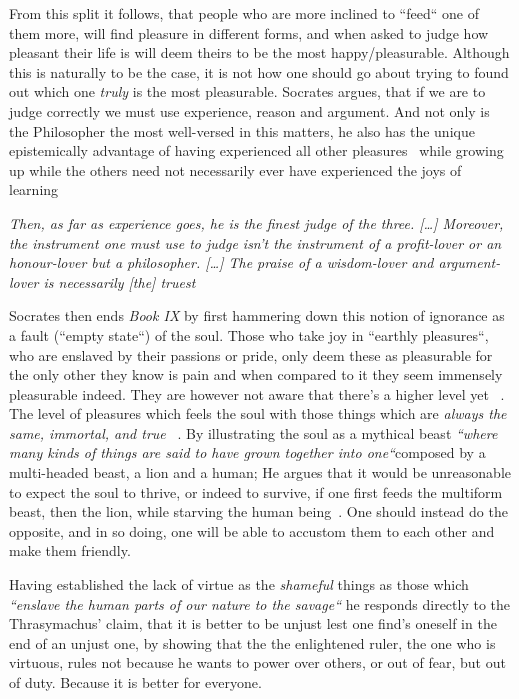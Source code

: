 \documentclass[english,course]{Notes}
\newcommand{\ita}[1]{\textit{#1}}
\newcommand\quo[1]{\begin{displayquote}\ita{\large{#1}}\end{displayquote}}
\begin{document}
\par{From this split it follows, that people who are more inclined to ``feed`` one of them more, will find pleasure in different forms, and when asked to judge how pleasant their life is will deem theirs to be the most happy/pleasurable. Although this is naturally to be the case, it is not how one should go about trying to found out which one \ita{truly} is the most pleasurable. Socrates argues, that if we are to judge correctly we must use experience, reason and argument. And not only is the Philosopher the most well-versed in this matters, he also has the unique epistemically advantage of having experienced all other pleasures~ while growing up while the others need not necessarily ever have experienced the joys of learning}

\quo{Then, as far as experience goes, he is the finest judge of the three. [\dots] Moreover, the instrument one must use to judge isn't the instrument of a profit-lover or an honour-lover but a philosopher. [\dots] The praise of a wisdom-lover and argument-lover is necessarily [the] truest}

\par{Socrates then ends \ita{Book IX} by first hammering down this notion of ignorance as a fault (``empty state``) of the soul. Those who take joy in ``earthly pleasures``, who are enslaved by their passions or pride, only deem these as pleasurable for the only other they know is pain and when compared to it they seem immensely pleasurable indeed. They are however not aware that there's a higher level yet~ . The level of pleasures which feels the soul with those things which are \ita{always the same, immortal, and true} ~. By illustrating the soul as a mythical beast \ita{``where many kinds of things are said to have grown together into one``}composed by a multi-headed beast, a lion and a human; He argues that it would be unreasonable to expect the soul to thrive, or indeed to survive, if one first feeds the multiform beast, then the lion, while starving the human being~. One should instead do the opposite, and in so doing, one will be able to accustom them to each other and make them friendly.}

\par{Having established the lack of virtue as the \ita{shameful} things as those which \ita{``enslave the human parts of our nature to the savage``} he responds directly to the Thrasymachus' claim, that it is better to be unjust lest one find's oneself in the end of an unjust one, by showing that the the enlightened ruler, the one who is virtuous, rules not because he wants to power over others, or out of fear, but out of duty. Because it is better for everyone.}
\end{document}
